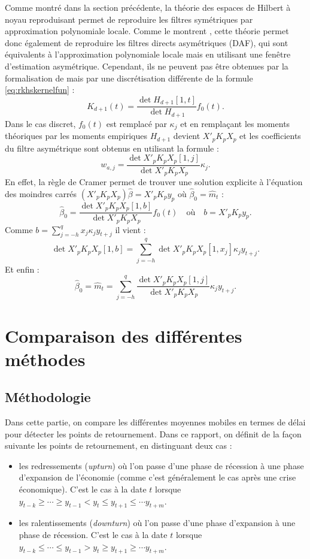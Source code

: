 \documentclass[
  11pt,
  french,
  a4paper]{article}
\newcommand\1{\mathds{1}}
\begin{document}
Comme montré dans la section précédente, la théorie des espaces de Hilbert à noyau reproduisant permet de reproduire les filtres symétriques par approximation polynomiale locale.
Comme le montrent \textcite{LuatiProietti2011}, cette théorie permet donc également de reproduire les filtres directs asymétriques (DAF), qui sont équivalents à l'approximation polynomiale locale mais en utilisant une fenêtre d'estimation asymétrique.
Cependant, ils ne peuvent pas être obtenues par la formalisation de \textcite{dagumbianconcini2008} mais par une discrétisation différente de la formule \eqref{eq:rkhskernelfun} :
\[
K_{d+1}(t)=\frac{\det{H_{d+1}[1,t]}}{\det{H_{d+1}}}f_0(t).
\]
Dans le cas discret, \(f_0(t)\) est remplacé par \(\kappa_j\) et en remplaçant les moments théoriques par les moments empiriques \(H_{d+1}\) devient \(X'_pK_pX_p\) et les coefficients du filtre asymétrique sont obtenus en utilisant la formule :
\[
w_{a,j}=\frac{\det{X'_pK_pX_p[1,j]}
}{
\det{X'_pK_pX_p}
}\kappa_j.
\]
En effet, la règle de Cramer permet de trouver une solution explicite à l'équation des moindres carrés \((X'_pK_pX_p)\hat \beta=X'_pK_py_p\) où \(\hat \beta_0=\hat m_t\) :
\[
\hat \beta_0 = \frac{\det{X'_pK_pX_p[1,b]}}{\det{X'_pK_pX_p}}f_0(t)
\quad\text{où}\quad b=X'_pK_py_p.
\]
Comme \(b=\sum_{j=-h}^qx_j\kappa_jy_{t+j}\) il vient :
\[
\det{X'_pK_pX_p[1,b]} = \sum_{j=-h}^q\det{X'_pK_pX_p[1,x_j]}\kappa_jy_{t+j}.
\]
Et enfin :
\[
\hat \beta_0 = \hat m_t= \sum_{j=-h}^q\frac{\det{X'_pK_pX_p[1,j]}
}{
\det{X'_pK_pX_p}
}\kappa_j y_{t+j}.
\]

\hypertarget{sec-comparison}{%
\section{Comparaison des différentes méthodes}\label{sec-comparison}}

\hypertarget{muxe9thodologie}{%
\subsection{Méthodologie}\label{muxe9thodologie}}

Dans cette partie, on compare les différentes moyennes mobiles en termes de délai pour détecter les points de retournement.
Dans ce rapport, on définit de la façon suivante les points de retournement, en distinguant deux cas :

\begin{itemize}
\item
  les redressements (\emph{upturn}) où l'on passe d'une phase de récession à une phase d'expansion de l'économie (comme c'est généralement le cas après une crise économique).
  C'est le cas à la date \(t\) lorsque \(y_{t-k}\geq\cdots\geq y_{t-1}<y_t\leq y_{t+1}\leq\cdots y_{t+m}\).
\item
  les ralentissements (\emph{downturn}) où l'on passe d'une phase d'expansion à une phase de récession.
  C'est le cas à la date \(t\) lorsque \(y_{t-k}\leq\cdots\leq y_{t-1}>y_t\geq y_{t+1}\geq\cdots y_{t+m}\).
\end{itemize}
\end{document}
